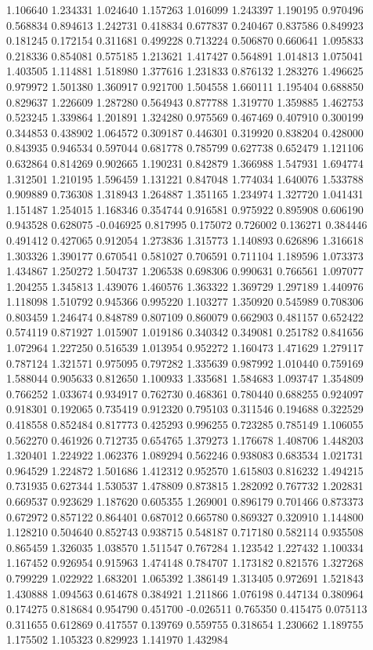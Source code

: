 1.106640
1.234331
1.024640
1.157263
1.016099
1.243397
1.190195
0.970496
0.568834
0.894613
1.242731
0.418834
0.677837
0.240467
0.837586
0.849923
0.181245
0.172154
0.311681
0.499228
0.713224
0.506870
0.660641
1.095833
0.218336
0.854081
0.575185
1.213621
1.417427
0.564891
1.014813
1.075041
1.403505
1.114881
1.518980
1.377616
1.231833
0.876132
1.283276
1.496625
0.979972
1.501380
1.360917
0.921700
1.504558
1.660111
1.195404
0.688850
0.829637
1.226609
1.287280
0.564943
0.877788
1.319770
1.359885
1.462753
0.523245
1.339864
1.201891
1.324280
0.975569
0.467469
0.407910
0.300199
0.344853
0.438902
1.064572
0.309187
0.446301
0.319920
0.838204
0.428000
0.843935
0.946534
0.597044
0.681778
0.785799
0.627738
0.652479
1.121106
0.632864
0.814269
0.902665
1.190231
0.842879
1.366988
1.547931
1.694774
1.312501
1.210195
1.596459
1.131221
0.847048
1.774034
1.640076
1.533788
0.909889
0.736308
1.318943
1.264887
1.351165
1.234974
1.327720
1.041431
1.151487
1.254015
1.168346
0.354744
0.916581
0.975922
0.895908
0.606190
0.943528
0.628075
-0.046925
0.817995
0.175072
0.726002
0.136271
0.384446
0.491412
0.427065
0.912054
1.273836
1.315773
1.140893
0.626896
1.316618
1.303326
1.390177
0.670541
0.581027
0.706591
0.711104
1.189596
1.073373
1.434867
1.250272
1.504737
1.206538
0.698306
0.990631
0.766561
1.097077
1.204255
1.345813
1.439076
1.460576
1.363322
1.369729
1.297189
1.440976
1.118098
1.510792
0.945366
0.995220
1.103277
1.350920
0.545989
0.708306
0.803459
1.246474
0.848789
0.807109
0.860079
0.662903
0.481157
0.652422
0.574119
0.871927
1.015907
1.019186
0.340342
0.349081
0.251782
0.841656
1.072964
1.227250
0.516539
1.013954
0.952272
1.160473
1.471629
1.279117
0.787124
1.321571
0.975095
0.797282
1.335639
0.987992
1.010440
0.759169
1.588044
0.905633
0.812650
1.100933
1.335681
1.584683
1.093747
1.354809
0.766252
1.033674
0.934917
0.762730
0.468361
0.780440
0.688255
0.924097
0.918301
0.192065
0.735419
0.912320
0.795103
0.311546
0.194688
0.322529
0.418558
0.852484
0.817773
0.425293
0.996255
0.723285
0.785149
1.106055
0.562270
0.461926
0.712735
0.654765
1.379273
1.176678
1.408706
1.448203
1.320401
1.224922
1.062376
1.089294
0.562246
0.938083
0.683534
1.021731
0.964529
1.224872
1.501686
1.412312
0.952570
1.615803
0.816232
1.494215
0.731935
0.627344
1.530537
1.478809
0.873815
1.282092
0.767732
1.202831
0.669537
0.923629
1.187620
0.605355
1.269001
0.896179
0.701466
0.873373
0.672972
0.857122
0.864401
0.687012
0.665780
0.869327
0.320910
1.144800
1.128210
0.504640
0.852743
0.938715
0.548187
0.717180
0.582114
0.935508
0.865459
1.326035
1.038570
1.511547
0.767284
1.123542
1.227432
1.100334
1.167452
0.926954
0.915963
1.474148
0.784707
1.173182
0.821576
1.327268
0.799229
1.022922
1.683201
1.065392
1.386149
1.313405
0.972691
1.521843
1.430888
1.094563
0.614678
0.384921
1.211866
1.076198
0.447134
0.380964
0.174275
0.818684
0.954790
0.451700
-0.026511
0.765350
0.415475
0.075113
0.311655
0.612869
0.417557
0.139769
0.559755
0.318654
1.230662
1.189755
1.175502
1.105323
0.829923
1.141970
1.432984
